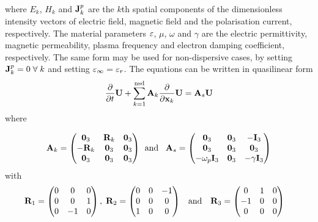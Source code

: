where $E_k$, $H_k$ and $\mathbf{J}^p_k$ are the $k$th spatial components of the
dimensionless intensity vectors of electric field, magnetic field and the
polarisation current, respectively. The material parameters $\varepsilon$, $\mu$,
$\omega$ and $\gamma$ are the electric permittivity, magnetic permeability,
plasma frequency and electron damping coefficient, respectively. The same form
may be used for non-dispersive cases, by setting $\mathbf{J}^p_k = 0 \; \forall \; k$ and
setting $\varepsilon_{\infty} = \varepsilon_{r}$. The equations can be written in quasilinear
form
\begin{equation}
  \label{eq:quasilinear-form}
  \frac{\partial}{\partial t} \mathbf{U}  + \sum_{k=1}^{\textrm{nsd}}\mathbf{A}_k\frac{\partial}{\partial\mathbf{x}_k}{\mathbf{U}} = \mathbf{A}_s \mathbf{U}
\end{equation}
where

\begin{align}
  \mathbf{A}_k = 
  \begin{pmatrix}
    \mathbf{0}_3 & \mathbf{R}_{k} & \mathbf{0}_3 \\
    -\mathbf{R}_{k} & \mathbf{0}_3 & \mathbf{0}_3 \\
    \mathbf{0}_3 & \mathbf{0}_3 & \mathbf{0}_3 \\
  \end{pmatrix}
  \: \:
  \textrm{and}\;\;\;
  \mathbf{A}_s = 
  \begin{pmatrix}
    \mathbf{0}_3  & \mathbf{0}_3 & -\mathbf{I}_3\\
    \mathbf{0}_3 & \mathbf{0}_3 & \mathbf{0}_3 \\
    -\omega_p \mathbf{I}_3 & \mathbf{0}_3 & - \gamma \mathbf{I}_3 \\
  \end{pmatrix}
\end{align}
with
\begin{align}
  \mathbf{R}_1 = 
  \begin{pmatrix}
    0 & 0 & 0 \\
    0 & 0 & 1 \\
    0 & -1 & 0 \\
  \end{pmatrix} , \: \: & \mathbf{R}_2 =
                          \begin{pmatrix}
                            0 & 0 & -1 \\
                            0 & 0 & 0 \\
                            1 & 0 & 0 \\
                          \end{pmatrix}
      &
        \textrm{and   } \:\:\:
          &
            \mathbf{R}_3 = 
            \begin{pmatrix}
              0 & 1 & 0 \\
              -1 & 0 & 0 \\
              0 & 0 & 0 \\
            \end{pmatrix}
      &
\end{align}

